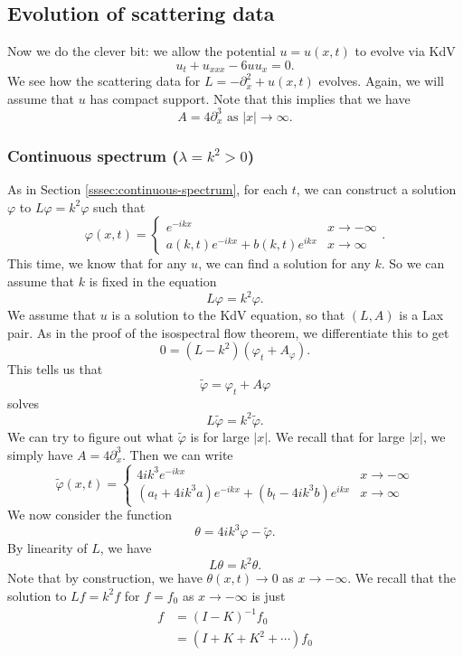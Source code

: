 \documentclass[a4paper]{article}
\begin{document}
\subsection{Evolution of scattering data}
Now we do the clever bit: we allow the potential $u = u(x, t)$ to evolve via KdV
\[
  u_t + u_{xxx} - 6 u u_x = 0.
\]
We see how the scattering data for $L = -\partial_x^2 + u(x, t)$ evolves. Again, we will assume that $u$ has compact support. Note that this implies that we have
\[
  A = 4 \partial_x^3\text{ as }|x| \to \infty.
\]
\subsubsection{Continuous spectrum (\texorpdfstring{$\lambda = k^2 > 0$}{lambda = k^2 > 0})}
As in Section \ref{sssec:continuous-spectrum}, for each $t$, we can construct a solution $\varphi$ to $L \varphi = k^2 \varphi$ such that
\[
  \varphi(x, t) =
  \begin{cases}
    e^{-ikx} & x \to -\infty\\
    a(k, t) e^{-ikx} + b(k, t) e^{ikx} & x \to \infty
  \end{cases}.
\]
This time, we know that for any $u$, we can find a solution for any $k$. So we can assume that $k$ is fixed in the equation
\[
  L\varphi = k^2 \varphi.
\]
We assume that $u$ is a solution to the KdV equation, so that $(L, A)$ is a Lax pair. As in the proof of the isospectral flow theorem, we differentiate this to get
\[
  0 = (L - k^2)(\varphi_t + A_\varphi).
\]
This tells us that
\[
  \tilde{\varphi} = \varphi_t + A \varphi
\]
solves
\[
  L \tilde{\varphi} = k^2 \tilde{\varphi}.
\]
We can try to figure out what $\tilde{\varphi}$ is for large $|x|$. We recall that for large $|x|$, we simply have $A = 4 \partial_x^3$. Then we can write
\[
  \tilde{\varphi}(x, t) =
  \begin{cases}
    4 ik^3 e^{-ikx} & x \to -\infty\\
    (a_t + 4 ik^3 a)e^{-ikx} + (b_t - 4ik^3 b) e^{ikx} & x \to \infty
  \end{cases}
\]
We now consider the function
\[
  \theta = 4ik^3 \varphi - \tilde{\varphi}.
\]
By linearity of $L$, we have
\[
  L \theta = k^2 \theta.
\]
Note that by construction, we have $\theta(x, t) \to 0$ as $x \to -\infty$. We recall that the solution to $Lf = k^2 f$ for $f = f_0$ as $x \to -\infty$ is just
\begin{align*}
  f &= (I - K)^{-1} f_0\\
  &= (I + K + K^2 + \cdots)f_0
\end{align*}
\end{document}
